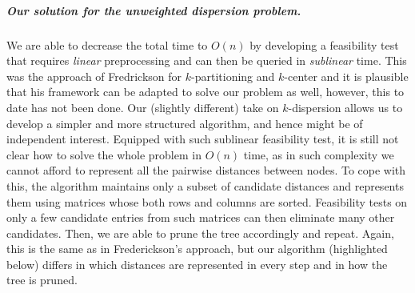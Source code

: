 \documentclass[a4paper,UKenglish]{lipics-v2016}
\theoremstyle{plain}
\renewcommand{\paragraph}{\subparagraph}
\begin{document}
\paragraph{Our solution for the unweighted dispersion problem.}
We are able to decrease the total time to $O(n)$ by
developing a feasibility test that requires {\em linear} preprocessing and can then be queried in \emph{sublinear} time. This was the approach of Fredrickson for $k$-partitioning and $k$-center and it is plausible that his framework can be adapted to solve our problem as well,
however, this to date has not been done. Our (slightly different) take on $k$-dispersion allows us to develop a  simpler and more structured algorithm, and hence might be of independent interest.
Equipped with such sublinear feasibility test, it is still not clear how to solve the whole problem in $O(n)$ time, as in such complexity we cannot afford to represent all the pairwise
distances between nodes. To cope with this, the algorithm maintains %
only a subset of candidate distances and represents them using matrices whose both rows and columns are sorted.  Feasibility tests on only a few candidate entries from 
such matrices can then eliminate many other candidates. Then, we are able to prune the tree accordingly and repeat.
Again, this is the same as in Frederickson's approach, but our algorithm (highlighted below) differs in which distances are represented in every step and in how the tree is pruned. 
\end{document}
